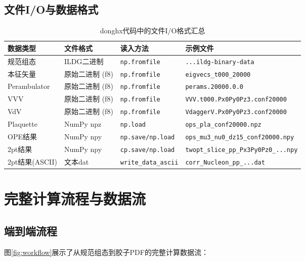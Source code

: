 \documentclass[12pt,a4paper]{ctexart}
\begin{document}
\subsection{文件I/O与数据格式}

\begin{table}[htbp]
\centering
\caption{donghx代码中的文件I/O格式汇总}
\label{tab:file_formats}
\begin{tabular}{@{}llll@{}}
\toprule
\textbf{数据类型} & \textbf{文件格式} & \textbf{读入方法} & \textbf{示例文件} \\
\midrule
规范组态 & ILDG二进制 & \texttt{np.fromfile} & \texttt{...ildg-binary-data} \\
本征矢量 & 原始二进制 (f8) & \texttt{np.fromfile} & \texttt{eigvecs\_t000\_20000} \\
Perambulator & 原始二进制 (f8) & \texttt{np.fromfile} & \texttt{perams.20000.0.0} \\
VVV & 原始二进制 (f8) & \texttt{np.fromfile} & \texttt{VVV.t000.Px0Py0Pz3.conf20000} \\
VdV & 原始二进制 (f8) & \texttt{np.fromfile} & \texttt{VdaggerV.Px0Py0Pz3.conf20000} \\
Plaquette & NumPy npz & \texttt{np.load} & \texttt{ops\_pla\_conf20000.npz} \\
OPE结果 & NumPy npy & \texttt{np.save/np.load} & \texttt{ops\_mu3\_nu0\_dz15\_conf20000.npy} \\
2pt结果 & NumPy npy & \texttt{cp.save/np.load} & \texttt{twopt\_slice\_pp\_Px3Py0Pz0\_...npy} \\
2pt结果(ASCII) & 文本dat & \texttt{write\_data\_ascii} & \texttt{corr\_Nucleon\_pp\_...dat} \\
\bottomrule
\end{tabular}
\end{table}

\section{完整计算流程与数据流}

\subsection{端到端流程}

图\ref{fig:workflow}展示了从规范组态到胶子PDF的完整计算数据流：
\end{document}
